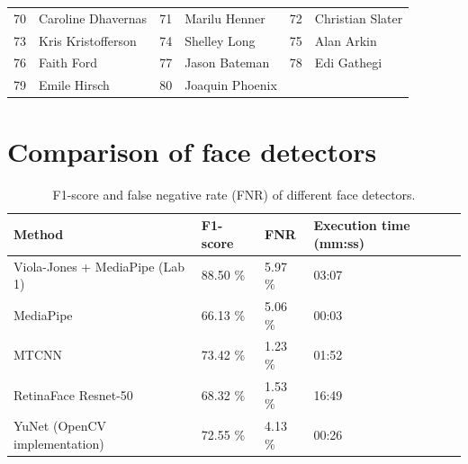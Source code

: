 \documentclass[11pt, a4paper]{article}
\numberwithin{equation}{subsection}
\begin{document}
\begin{appendices}
\begin{table}[htbp]
\begin{tabular}{|c|l|c|l|c|l|}
        70          & Caroline Dhavernas                  & 71          & Marilu Henner                       & 72          & Christian Slater                  \\ 
        73          & Kris Kristofferson                  & 74          & Shelley Long                        & 75          & Alan Arkin                        \\ 
        76          & Faith Ford                          & 77          & Jason Bateman                       & 78          & Edi Gathegi                       \\ 
        79          & Emile Hirsch                        & 80          & Joaquin Phoenix                     &             &                                    \\ \hline
    \end{tabular}
\end{table}

\section{Comparison of face detectors}\label{appendix:fd_comparison}

\begin{table}[htbp]
    \centering
    \label{tab:fd_comparison}
    \caption{F1-score and false negative rate (FNR) of different face detectors.}
    \begin{tabular}{|l|l|l|l|}
    \hline
    \textbf{Method} & \textbf{F1-score} & \textbf{FNR} & \textbf{Execution time (mm:ss)} \\ \hline
    Viola-Jones + MediaPipe (Lab 1) & 88.50 \% & 5.97 \% & 03:07 \\
    MediaPipe & 66.13 \% & 5.06 \% & 00:03 \\
    MTCNN & 73.42 \% & 1.23 \% & 01:52 \\
    RetinaFace Resnet-50 & 68.32 \% & 1.53 \% & 16:49 \\
    YuNet (OpenCV implementation) & 72.55 \% & 4.13 \% & 00:26 \\
    \hline
    \end{tabular}
\end{table}



\end{appendices}
\end{document}
